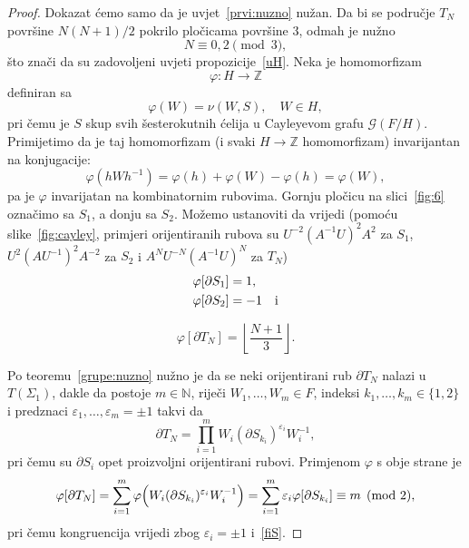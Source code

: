 \documentclass[11pt]{scrartcl}
\begin{document}
\begin{proof}
Dokazat ćemo samo da je uvjet~\eqref{prvi:nuzno} nužan. Da bi se područje $T_N$ površine $N(N+1)/2$ pokrilo pločicama površine $3$, odmah je nužno 
\begin{equation}\label{02mod3}
N \equiv 0,2 \pmod{3},
\end{equation}
što znači da su zadovoljeni uvjeti propozicije~\ref{uH}. Neka je homomorfizam \[\varphi\colon H\to \mathbb{Z}\] definiran sa 
\[\varphi(W) = \nu(W, S), \quad W \in H,\]
pri čemu je $S$ skup svih šesterokutnih ćelija u Cayleyevom grafu $\mathcal{G}(F/H)$. Primijetimo da je taj homomorfizam (i svaki $H \to \mathbb{Z}$ homomorfizam) invarijantan na konjugacije:
\[
\varphi(hWh^{-1}) = \varphi(h) + \varphi(W) - \varphi(h) = \varphi(W),
\]
pa je $\varphi$ invarijatan na kombinatornim rubovima. Gornju pločicu na slici~\ref{fig:6} označimo sa $S_1$, a donju sa $S_2$. Možemo ustanoviti da vrijedi (pomoću slike~\ref{fig:cayley}, primjeri orijentiranih rubova su $U^{-2}(A^{-1}U)^2A^2$ za $S_1$, $U^2(AU^{-1})^2A^{-2}$ za $S_2$ i $A^NU^{-N}(A^{-1}U)^N$ za $T_N$)
\begin{equation}\label{fiS}
\begin{aligned}
&\varphi[\partial S_1] = 1, \\ 
&\varphi[\partial S_2] = -1 \quad \text i \\ 
\end{aligned}
\end{equation}

\begin{equation}\label{fiT_N}
\varphi[\partial T_N] = \left\lfloor  \frac{N+1}{3} \right\rfloor.
\end{equation}

Po teoremu~\ref{grupe:nuzno} nužno je da se neki orijentirani rub $\partial T_N$ nalazi u $T(\Sigma_1)$, dakle da postoje $m \in \mathbb{N}$, riječi $W_1,\ldots,W_m \in F$, indeksi $k_1,\ldots,k_m \in \{1,2\}$ i predznaci $\varepsilon_1,\ldots,\varepsilon_m = \pm 1$ takvi da
\[
\partial T_N = \prod \limits_{i = 1}^m W_i (\partial S_{k_i})^{\varepsilon_i} W_i^{-1},
\]
pri čemu su $\partial S_i$ opet proizvoljni orijentirani rubovi. Primjenom $\varphi$ s obje strane je
\begin{equation} \label{fimod2}
\varphi [\partial T_N] = \sum \limits_{i=1}^m \varphi\Bigl( W_i (\partial S_{k_i})^{\varepsilon_i} W_i^{-1} \Bigr)
= \sum \limits_{i=1}^m \varepsilon_i \varphi[\partial S_{k_i}] \equiv m\pmod{2},
\end{equation}
pri čemu kongruencija vrijedi zbog $\varepsilon_i = \pm 1$ i~\eqref{fiS}. 


\end{proof}
\end{document}
